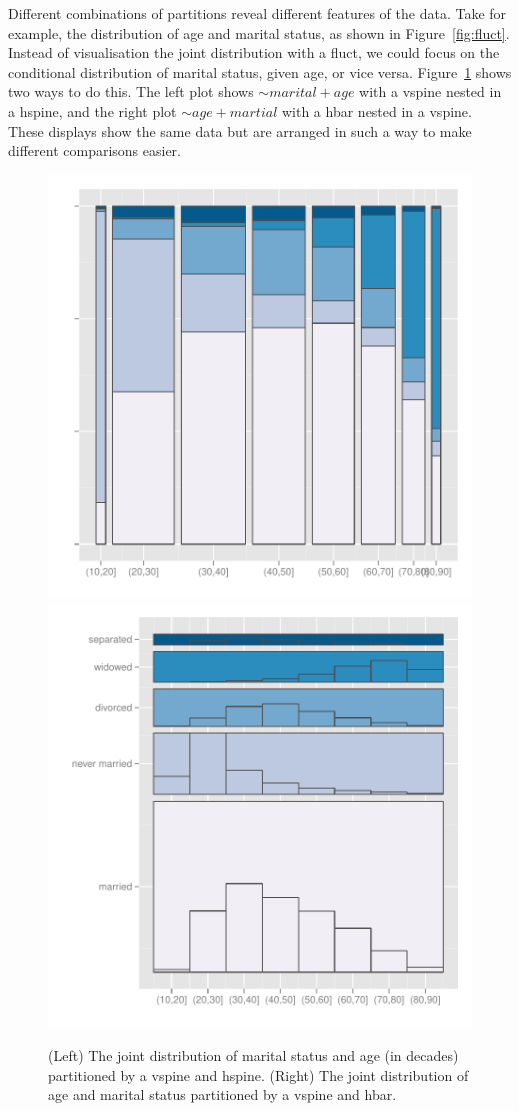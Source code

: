 \documentclass[journal]{vgtc}
\begin{document}

Different combinations of partitions reveal different features of the data. Take for example, the distribution of age and marital status, as shown in Figure~\ref{fig:fluct}. Instead of visualisation the joint distribution with a fluct, we could focus on the conditional distribution of marital status, given age, or vice versa. Figure~\ref{fig:marital} shows two ways to do this. The left plot shows $\sim marital + age$ with a vspine nested in a hspine, and the right plot $\sim age + martial$ with a hbar nested in a vspine. These displays show the same data but are arranged in such a way to make different comparisons easier.

\begin{figure}[htbp]
  \centering
    \includegraphics[width=0.5\linewidth]{part-marital-1}%
    \includegraphics[width=0.5\linewidth]{part-marital-2}
  \caption{(Left) The joint distribution of marital status and age (in decades) partitioned by a vspine and hspine.  (Right) The joint distribution of age and marital status partitioned by a vspine and hbar.}
  \label{fig:marital}
\end{figure}
\end{document}
